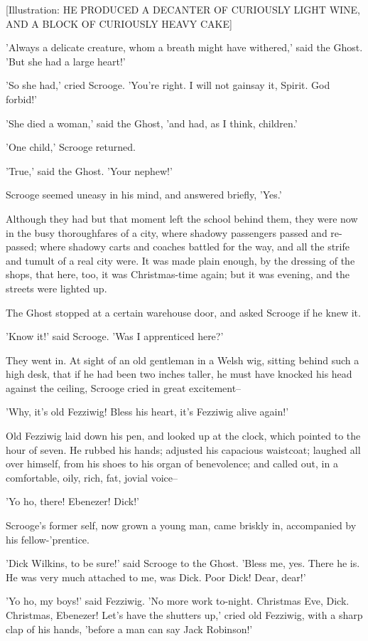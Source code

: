 [Illustration: HE PRODUCED A DECANTER OF CURIOUSLY LIGHT WINE, AND A
BLOCK OF CURIOUSLY HEAVY CAKE]

'Always a delicate creature, whom a breath might have withered,' said
the Ghost. 'But she had a large heart!'

'So she had,' cried Scrooge. 'You're right. I will not gainsay it,
Spirit. God forbid!'

'She died a woman,' said the Ghost, 'and had, as I think, children.'

'One child,' Scrooge returned.

'True,' said the Ghost. 'Your nephew!'

Scrooge seemed uneasy in his mind, and answered briefly, 'Yes.'

Although they had but that moment left the school behind them, they were
now in the busy thoroughfares of a city, where shadowy passengers passed
and re-passed; where shadowy carts and coaches battled for the way, and
all the strife and tumult of a real city were. It was made plain enough,
by the dressing of the shops, that here, too, it was Christmas-time
again; but it was evening, and the streets were lighted up.

The Ghost stopped at a certain warehouse door, and asked Scrooge if he
knew it.

'Know it!' said Scrooge. 'Was I apprenticed here?'

They went in. At sight of an old gentleman in a Welsh wig, sitting
behind such a high desk, that if he had been two inches taller, he must
have knocked his head against the ceiling, Scrooge cried in great
excitement--

'Why, it's old Fezziwig! Bless his heart, it's Fezziwig alive again!'

Old Fezziwig laid down his pen, and looked up at the clock, which
pointed to the hour of seven. He rubbed his hands; adjusted his
capacious waistcoat; laughed all over himself, from his shoes to his
organ of benevolence; and called out, in a comfortable, oily, rich, fat,
jovial voice--

'Yo ho, there! Ebenezer! Dick!'

Scrooge's former self, now grown a young man, came briskly in,
accompanied by his fellow-'prentice.

'Dick Wilkins, to be sure!' said Scrooge to the Ghost. 'Bless me, yes.
There he is. He was very much attached to me, was Dick. Poor Dick! Dear,
dear!'

'Yo ho, my boys!' said Fezziwig. 'No more work to-night. Christmas Eve,
Dick. Christmas, Ebenezer! Let's have the shutters up,' cried old
Fezziwig, with a sharp clap of his hands, 'before a man can say Jack
Robinson!'

